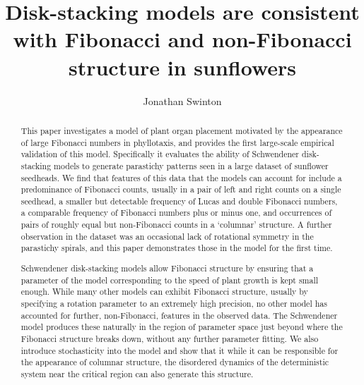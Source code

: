 \documentclass[a4paper,10pt]{amsart}
\begin{document}
\title[Disk-stacking models]{Disk-stacking models are consistent with Fibonacci and non-Fibonacci structure in sunflowers} 
\author{Jonathan Swinton}
\address{ORCID 0000-0002-3196-9653}




\begin{abstract}
This paper investigates a model of plant organ placement motivated by the appearance of large Fibonacci numbers in phyllotaxis, and provides the first large-scale empirical validation of this model. Specifically it evaluates the ability of Schwendener disk-stacking models to generate parastichy patterns seen in a large dataset of sunflower seedheads. We find that features of this data that the models can account for include a predominance of Fibonacci counts, usually in a pair of left and right counts on a single seedhead, a smaller but detectable frequency of Lucas and double Fibonacci numbers, a comparable frequency of Fibonacci numbers plus or minus one, and occurrences of pairs of roughly equal but non-Fibonacci counts in a `columnar' structure. A further observation in the dataset was an occasional lack of rotational symmetry in the parastichy spirals, and this paper demonstrates those in the model for the first time.

 Schwendener disk-stacking models allow Fibonacci structure by ensuring that a parameter of the model corresponding to the speed of plant growth is kept small enough. While many other models can exhibit Fibonacci structure, usually by specifying a rotation parameter to an extremely high precision, no other model has accounted for further, non-Fibonacci, features in the observed data.  The Schwendener model produces these naturally in the region of parameter space just beyond where the Fibonacci structure breaks down, without any further parameter fitting. We also introduce stochasticity into the model and show that it while it can be responsible for the appearance of columnar structure, the disordered dynamics of the deterministic system near the critical region can also generate this structure. 

\end{abstract}
\maketitle 

\end{document}
